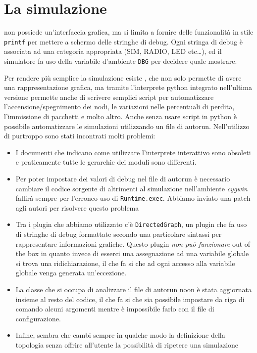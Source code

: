 \documentclass[twoside,11pt,a4paper,italian,openany]{book}
\begin{document}
\section{La simulazione}

\tos non possiede un'interfaccia grafica, ma si limita a fornire delle funzionalità in stile 
\texttt{printf} per mettere a schermo delle stringhe di debug. 
Ogni stringa di debug è associata ad una categoria appropriata (SIM, RADIO, LED etc\ldots), 
ed il simulatore fa uso della variabile d'ambiente \texttt{DBG} per decidere quale mostrare. 

Per rendere più semplice la simulazione esiste \tv, che non solo permette di avere una 
rappresentazione grafica, ma tramite l'interprete python integrato nell'ultima versione 
permette anche di scrivere semplici script per automatizzare l'accensione/spegnimento dei nodi,
le variazioni nelle percentuali di perdita, l'immissione di pacchetti e molto altro. 
Anche senza usare script in python è possibile automatizzare le simulazioni utilizzando un file 
di autorun.
Nell'utilizzo di \tv purtroppo sono stati incontrati molti problemi:
\begin{itemize}
\item{I documenti che indicano come utilizzare l'interprete interattivo sono obsoleti e 
praticamente tutte le gerarchie dei moduli sono differenti.}
\item{Per poter impostare dei valori di debug nel file di autorun è necessario  
cambiare il codice sorgente di \tv altrimenti al simulazione nell'ambiente \emph{cygwin} 
fallirà sempre per l'erroneo uso di \texttt{Runtime.exec}. Abbiamo inviato una patch 
agli autori per risolvere questo problema}
\item{Tra i plugin  che abbiamo utilizzato c'è \texttt{DirectedGraph}, un plugin che fa uso 
di stringhe di debug formattate secondo una particolare sintassi per rappresentare informazioni 
grafiche. Questo plugin \emph{non può funzionare} out of the box in quanto invece di esserci 
una assegnazione ad una variabile globale si trova una ridichiarazione, il che fa si che 
ad ogni accesso alla variabile globale venga generata un'eccezione.}
\item{La classe che si occupa di analizzare il file di autorun noon è stata aggiornata insieme 
al resto del codice, il che fa si che sia possibile impostare da riga di comando alcuni 
argomenti mentre è impossibile farlo con il file di configurazione.}
\item{Infine, sembra che \tv cambi sempre in qualche modo la definizione della topologia senza 
offrire all'utente la possibilità di ripetere una simulazione}
\end{itemize}
\end{document}
